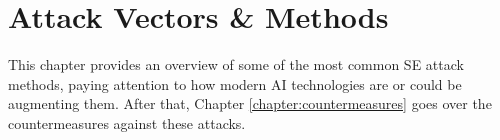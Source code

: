 


\chapter{Attack Vectors \& Methods \label{chapter:attacks}}
\begin{comment}

Guides:
    - About 3-4 pages

TODO:
    [ ] 

What to cover:
    - Attacks
        - Deepfake generated synthetic media
            - Videos
            - Images
            - Audio
            - Real-time voice morphing
    
Literature:
    - 

\end{comment}


This chapter provides an overview of some of the most common SE attack methods, paying attention to how modern AI technologies are or could be augmenting them. After that, Chapter \ref{chapter:countermeasures} goes over the countermeasures against these attacks.





